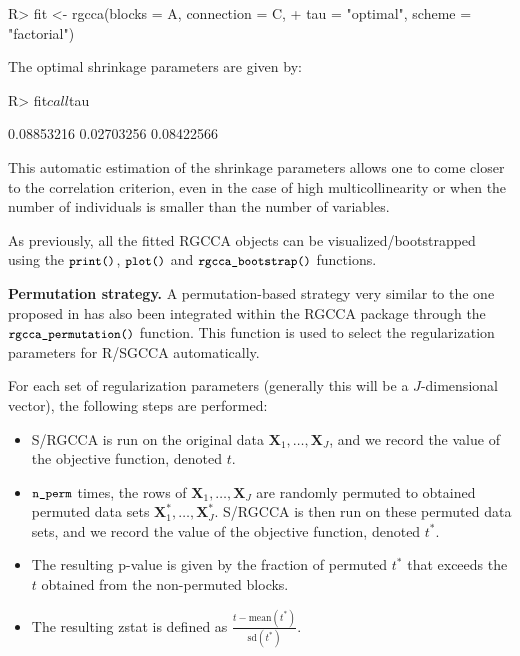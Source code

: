 \documentclass[
]{jss}
\begin{document}
\footnotesize

\begin{CodeChunk}
\begin{CodeInput}
R> fit <- rgcca(blocks = A, connection = C,
+              tau = "optimal", scheme = "factorial")
\end{CodeInput}
\end{CodeChunk}

\normalsize

The optimal shrinkage parameters are given by:

\footnotesize

\begin{CodeChunk}
\begin{CodeInput}
R> fit$call$tau
\end{CodeInput}
\begin{CodeOutput}
[1] 0.08853216 0.02703256 0.08422566
\end{CodeOutput}
\end{CodeChunk}

\normalsize

This automatic estimation of the shrinkage parameters allows one to come
closer to the correlation criterion, even in the case of high
multicollinearity or when the number of individuals is smaller than the
number of variables.

As previously, all the fitted RGCCA objects can be
visualized/bootstrapped using the \(\small{\texttt{print()}}\),
\(\small{\texttt{plot()}}\) and \(\small{\texttt{rgcca\_bootstrap()}}\)
functions.

\textbf{Permutation strategy.} A permutation-based strategy very similar
to the one proposed in \cite{Witten2009a} has also been integrated
within the RGCCA package through the
\(\small{\texttt{rgcca\_permutation()}}\) function. This function is
used to select the regularization parameters for R/SGCCA automatically.

For each set of regularization parameters (generally this will be a
\(J\)-dimensional vector), the following steps are performed:

\begin{itemize}
\item
  S/RGCCA is run on the original data
  \(\mathbf X_1, \ldots, \mathbf X_J\), and we record the value of the
  objective function, denoted \(t\).
\item
  \(\small{\texttt{n\_perm}}\) times, the rows of
  \(\mathbf X_1, \ldots, \mathbf X_J\) are randomly permuted to obtained
  permuted data sets \(\mathbf X_1^*, \ldots, \mathbf X_J^*\). S/RGCCA
  is then run on these permuted data sets, and we record the value of
  the objective function, denoted \(t^*\).
\item
  The resulting p-value is given by the fraction of permuted \(t^*\)
  that exceeds the \(t\) obtained from the non-permuted blocks.
\item
  The resulting zstat is defined as
  \(\frac{t-\text{mean}(t^*)}{\text{sd}(t^*)}\).
\end{itemize}
\end{document}
